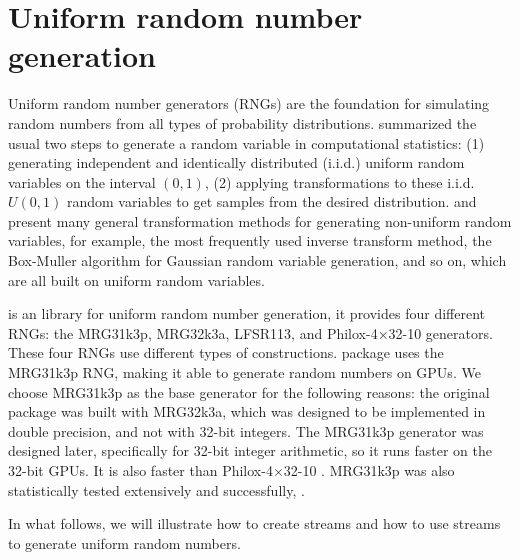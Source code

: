 \documentclass[article,nojss]{jss}\usepackage[]{graphicx}\usepackage[]{color}
\begin{document}
\section{Uniform random number generation} \label{}
Uniform random number generators (RNGs) are the foundation for simulating random numbers from all types of probability distributions. \cite{l2012random} summarized the usual two steps to generate a random variable in computational statistics: (1) generating independent and identically distributed (i.i.d.) uniform random variables on the interval $(0, 1)$, (2) applying transformations to these i.i.d. $U(0, 1)$ random variables to get samples from the desired distribution. \cite{l2012random} and \cite{robert2004random} present many general transformation methods for generating non-uniform random variables, for example, the most frequently used inverse transform method, the Box-Muller algorithm \citep{box1958note} for Gaussian random variable generation, and so on, which are all built on uniform random variables. %


 is an  library for uniform random number generation, it provides four different RNGs: the MRG31k3p, MRG32k3a, LFSR113, and Philox-4×32-10 generators. These four RNGs use different types of constructions.  package uses the MRG31k3p RNG, making it able to generate random numbers on GPUs. We choose MRG31k3p as the base generator for the following reasons:  the original  package \citep{l2002object} was built with MRG32k3a, which was designed to be implemented in double precision, and not with 32-bit integers. The MRG31k3p generator was designed later, specifically for 32-bit integer arithmetic, so it runs faster on the 32-bit GPUs.  It is also faster than Philox-4×32-10 \citep{rLEC00b}. MRG31k3p was also statistically tested extensively and successfully, \cite[see][]{rLEC07b}.    




In what follows, we will illustrate how to create streams and how to use streams to generate uniform random numbers. 

\end{document}
